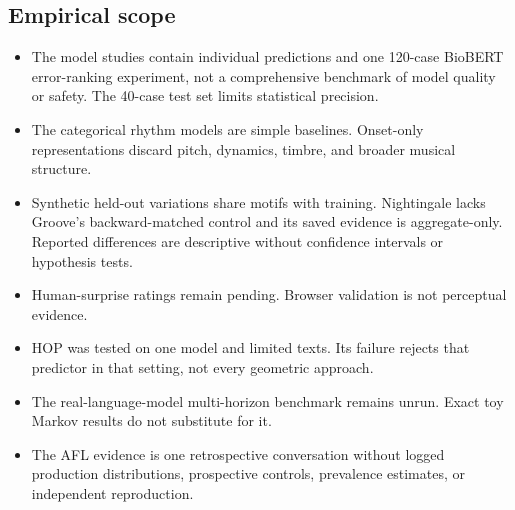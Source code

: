 \subsection{Empirical scope}
\begin{itemize}
  \item The model studies contain individual predictions and one 120-case BioBERT error-ranking experiment, not a comprehensive benchmark of model quality or safety. The 40-case test set limits statistical precision.
  \item The categorical rhythm models are simple baselines. Onset-only representations discard pitch, dynamics, timbre, and broader musical structure.
  \item Synthetic held-out variations share motifs with training. Nightingale lacks Groove's backward-matched control and its saved evidence is aggregate-only. Reported differences are descriptive without confidence intervals or hypothesis tests.
  \item Human-surprise ratings remain pending. Browser validation is not perceptual evidence.
  \item HOP was tested on one model and limited texts. Its failure rejects that predictor in that setting, not every geometric approach.
  \item The real-language-model multi-horizon benchmark remains unrun. Exact toy Markov results do not substitute for it.
  \item The AFL evidence is one retrospective conversation without logged production distributions, prospective controls, prevalence estimates, or independent reproduction.
\end{itemize}

